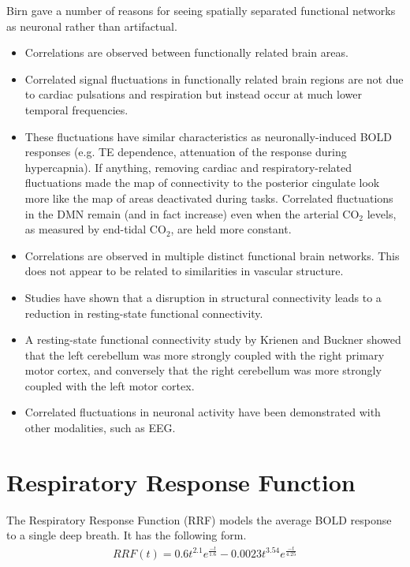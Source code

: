 \documentclass[twoside,twocolumn]{article}
\begin{document}
Birn\cite{Birn2012} gave a number of reasons for seeing spatially separated functional networks as neuronal rather than artifactual.
\begin{itemize}
	\item Correlations are observed between functionally related brain areas. 
	\item Correlated signal ﬂuctuations in functionally related brain regions are not due to cardiac pulsations and respiration but instead occur at much lower temporal frequencies\cite{Biswal1995}.
	\item These ﬂuctuations have similar characteristics as neuronally-induced BOLD responses (e.g. TE dependence, attenuation of the response during hypercapnia)\cite{Biswal1997}.  If anything, removing cardiac and respiratory-related ﬂuctuations made the map of connectivity to the posterior cingulate look more like the map of areas deactivated during tasks\cite{Birn2012}.  Correlated ﬂuctuations in the DMN remain (and in fact increase) even when the arterial CO$_2$ levels, as measured by end-tidal CO$_2$, are held more constant\cite{Madjar2011}.
	\item Correlations are observed in multiple distinct functional brain networks\cite{Beckmann2005}.  This does not appear to be related to similarities in vascular structure\cite{Birn2012}.
	\item Studies have shown that a disruption in structural connectivity leads to a reduction in resting-state functional connectivity.
	\item A resting-state functional connectivity study by Krienen and Buckner showed that the left cerebellum was more strongly coupled with the right primary motor cortex, and conversely that the right cerebellum was more strongly coupled with the left motor cortex.
	\item Correlated ﬂuctuations in neuronal activity have been demonstrated with other modalities, such as EEG\cite{Laufs2003}.
\end{itemize}

\section{Respiratory Response Function}

The Respiratory Response Function (RRF) models the average BOLD response to a single deep breath.  It has the following form.
\begin{eqnarray}
	RRF(t) = 0.6t^{2.1}e^{\frac{-t}{1.6}}-0.0023t^{3.54}e^{\frac{-t}{4.25}}
\end{eqnarray}
\end{document}
